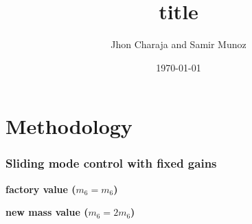 

\title[Article presentation]{title}

\author[J. Charaja and S. Munoz]{Jhon Charaja and Samir Munoz}
\date{\today}



	\frame{\titlepage}
	\section{Methodology}
	
	\begin{frame}
		\frametitle{Sliding mode control with fixed gains}
		
		\fboxrule=3pt
		\begin{minipage}[t]{0.45\textwidth}
			\graphicspath{{images/methodology/SMC/uncertainty_100_alpha_0/}}
			\centering
			{\large \textbf{factory value ($m_6=m_6$)}}
			\vspace{.2cm}			
		\end{minipage}
		\hspace{.08\textwidth}
		\begin{minipage}[t]{0.45\textwidth}
			\graphicspath{{images/methodology/SMC/uncertainty_100_alpha_0.005/}}
			\centering
			{\large \textbf{new mass value ($m_6=2 m_6$)}}
			\vspace{.2cm}
		\end{minipage}

	\end{frame}
